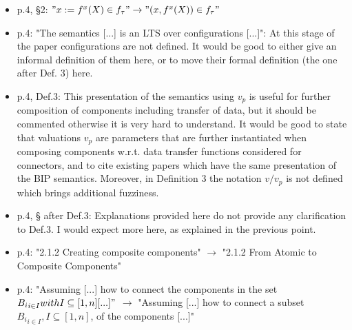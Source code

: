 \begin{itemize}
\item p.4, §2: $"x := f^x(X) \in f_{\tau}" \rightarrow "(x,f^x(X)) \in f_{\tau}"$
\done

\item p.4: "The semantics [...] is an LTS over configurations [...]": At this 
stage of the paper configurations are not defined. It would be good to either 
give an informal definition of them here, or to move their formal definition 
(the one after Def. 3) here.
\done
{}


\item p.4, Def.3: This presentation of the semantics using $v_p$ is useful for 
further composition of components including transfer of data, but it should 
be commented otherwise it is very hard to understand. It would be good to 
state that valuations $v_p$ are parameters that are further instantiated when 
composing components w.r.t. data transfer functions considered for 
connectors, and to cite existing papers which have the same presentation of 
the BIP semantics. Moreover, in Definition 3 the notation $v/v_p$ is not 
defined which brings additional fuzziness.

\done
{}


\item p.4, § after Def.3: Explanations provided here do not provide any 
clarification to Def.3. I would expect more here, as explained in the 
previous point.

\done

\item p.4: "2.1.2 Creating composite components" $\rightarrow$ "2.1.2 From Atomic to 
Composite Components"
\done

\item p.4: "Assuming [...] how to connect the components in the set ${B_i}_{i \in 
I} with I \subseteq [1,n] [...]"$ $\rightarrow$ "Assuming [...] how to connect a subset 
${B_i}_{i \in I}, I \subseteq [1,n]$, of the components [...]"
\done


\end{itemize}
